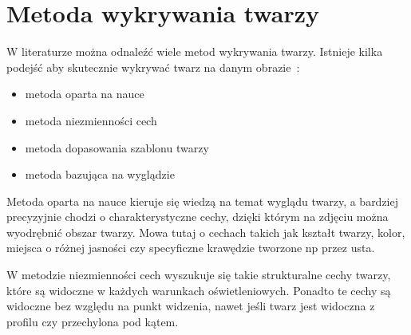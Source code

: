 \documentclass[a4paper,twoside,12pt]{book}
\begin{document}
    \section{Metoda wykrywania twarzy}\label{sec:metodaWykrywaniaTwarzy}
    W literaturze można odnaleźć wiele metod wykrywania twarzy.
    Istnieje kilka podejść aby skutecznie wykrywać twarz na danym obrazie~\cite{mehdiRizvi}:

    \begin{itemize}
        \item metoda oparta na nauce
        \item metoda niezmienności cech
        \item metoda dopasowania szablonu twarzy
        \item metoda bazująca na wyglądzie
    \end{itemize}
    Metoda oparta na nauce kieruje się wiedzą na temat wyglądu twarzy, a
    bardziej precyzyjnie chodzi o charakterystyczne cechy,
    dzięki którym na zdjęciu można wyodrębnić obszar twarzy.
    Mowa tutaj o cechach takich jak kształt twarzy, kolor, miejsca o różnej jasności czy specyficzne krawędzie tworzone np przez
    usta.

    W metodzie niezmienności cech wyszukuje się takie strukturalne cechy twarzy, które są widoczne w każdych warunkach
    oświetleniowych.
    Ponadto te cechy są widoczne bez względu na punkt widzenia, nawet jeśli twarz jest widoczna
    z profilu czy przechylona pod kątem.
\end{document}

